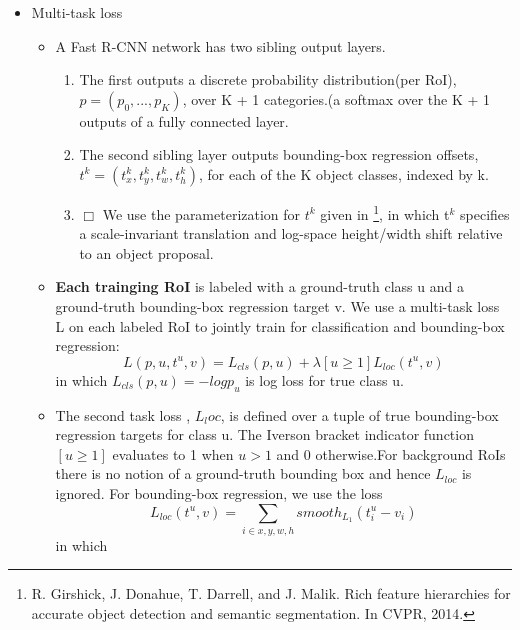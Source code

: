 \documentclass[11pt]{book}
\begin{document}
\begin{itemize}

\item Multi-task loss\\
\label{sec-1-1-3-1}%
\begin{itemize}
\item A Fast R-CNN network has two sibling output layers.
\begin{enumerate}
\item The first outputs a discrete probability distribution(per RoI), 
          $p = (p_0, ..., p_K)$, over K + 1 categories.(a softmax over the K + 1 outputs of a
          fully connected layer.
\item The second sibling layer outputs bounding-box regression offsets, 
          $t^k = (t_x^k, t_y^k, t_w^k, t_h^k)$, for each of the K object classes, indexed by k.
\item $\Box$ We use the parameterization for $t^k$ given in \footnote{R. Girshick, J. Donahue, T. Darrell, and J. Malik.  
  Rich feature hierarchies for accurate object detection and semantic segmentation. In CVPR, 2014.
 }, in which t$^k$ specifies a
          scale-invariant translation and log-space height/width shift relative to an object 
          proposal.
\end{enumerate}
\item \textbf{Each trainging RoI} is labeled with a ground-truth class u and a ground-truth bounding-box
       regression target v. We use a multi-task loss L on each labeled RoI to jointly train for
       classification and bounding-box regression:
       \begin{equation}
         L(p, u, t^u, v) = L_{cls}(p, u) + \lambda[u\ge1]L_{loc}(t^u, v)         
       \end{equation}
       in which $L_{cls}(p, u)  = -logp_u$ is log loss for true class u.
\item The second task loss , $L_loc$, is defined over a tuple of true bounding-box regression 
       targets for class u. The Iverson bracket indicator function $[u\ge1]$ evaluates to 1 when 
       $u>1$ and 0 otherwise.For background RoIs there is no notion of a ground-truth bounding box
       and hence $L_{loc}$ is ignored. For bounding-box regression, we use the loss
       \begin{equation}
         L_{loc}(t^u, v) = \sum_{i\in{x, y, w, h}} smooth_{L_1}(t_i^u - v_i)         
       \end{equation}
       in which 
       \begin{equation}

\end{equation}
\end{itemize}
\end{itemize}
\end{document}
